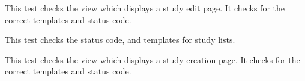 \documentclass[letterpaper,10pt,english]{sphinxmanual}
\begin{document}
\begin{fulllineitems}
\begin{fulllineitems}
\label{api:data.tests.StudyViewTests.test_study_edit}
This test checks the view which displays a study edit page.  It checks for the correct templates and status code.

\end{fulllineitems}



\begin{fulllineitems}
\label{api:data.tests.StudyViewTests.test_study_list}
This test checks the status code, and templates for study lists.

\end{fulllineitems}



\begin{fulllineitems}
\label{api:data.tests.StudyViewTests.test_study_new}
This test checks the view which displays a study creation page.  It checks for the correct templates and status code.

\end{fulllineitems}


\end{fulllineitems}


\end{document}
